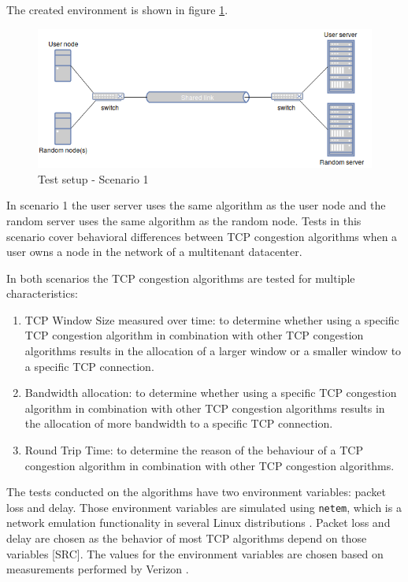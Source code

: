 \documentclass{article}
\begin{document}
	The created environment is shown in figure \ref{fig:setup1}.

	\begin{figure}[H] 
		\centering
  			\includegraphics[scale=0.5]{figs/setup2.png}
  			\caption{Test setup - Scenario 1}
  		\label{fig:setup1}
	\end{figure}
	
	In scenario 1 the user server uses the same algorithm as the user node and the random server uses the same algorithm as the random node. Tests in this scenario cover behavioral differences between TCP congestion algorithms when a user owns a node in the network of a multitenant datacenter.
	
	In both scenarios the TCP congestion algorithms are tested for multiple characteristics:
	\begin{enumerate}
		\item TCP Window Size measured over time: to determine whether using a specific TCP congestion algorithm in combination with other TCP congestion algorithms results in the allocation of a larger window or a smaller window to a specific TCP connection.
		\item Bandwidth allocation: to determine whether using a specific TCP congestion algorithm in combination with other TCP congestion algorithms results in the allocation of more bandwidth to a specific TCP connection.
		\item Round Trip Time: to determine the reason of the behaviour of a TCP congestion algorithm in combination with other TCP congestion algorithms.
	\end{enumerate}
The tests conducted on the algorithms have two environment variables: packet loss and delay. Those environment variables are simulated using \texttt{netem}, which is a network emulation functionality in several Linux distributions \cite{linux-netem}. Packet loss and delay are chosen as the behavior of most TCP algorithms depend on those variables [SRC]. The values for the environment variables are chosen based on measurements performed by Verizon \cite{verizon-latency}.
\end{document}
